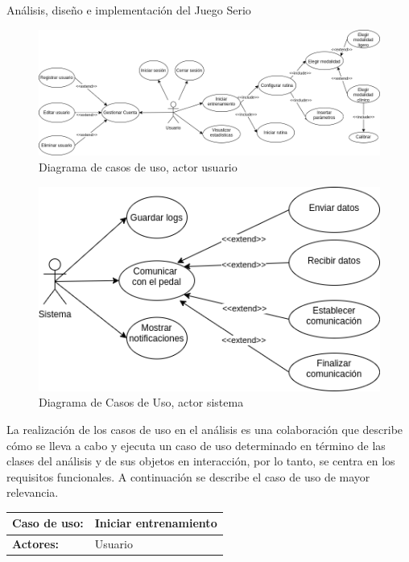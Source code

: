\begin{thesischapter}{2} {Análisis, diseño e implementación del Juego Serio}
    \vspace*{50pt}
    \begin{figure}[h]
        \centering
        \includegraphics[scale=0.44]{images/diagram-usecase-user.png}
        \caption{Diagrama de casos de uso, actor usuario}
        \label{fig: use-cases-user}
    \end{figure}

    \vspace*{50pt}
    \begin{figure}[h]
        \centering
        \includegraphics[scale=0.44]{images/diagram-usecase-system.png}
        \caption{Diagrama de Casos de Uso, actor sistema}
        \label{fig: use-cases-system}
    \end{figure}

    \vspace*{100pt}
    La realización de los casos de uso en el análisis es una colaboración que describe cómo se lleva a cabo y ejecuta un caso de uso 
    determinado en término de las clases del análisis y de sus objetos en interacción, por lo tanto, se centra en los requisitos funcionales. 
    A continuación se describe el caso de uso de mayor relevancia.
    
    \begin{center}
        \begin{table}
            \begin{tabularx}{\textwidth}{|X|X|}
                \hline
                \textbf{Caso de uso:} & Iniciar entrenamiento \\\hline
                \textbf{Actores:}     & Usuario \\\hline
                

\end{tabularx}
\end{table}
\end{center}
\end{thesischapter}
